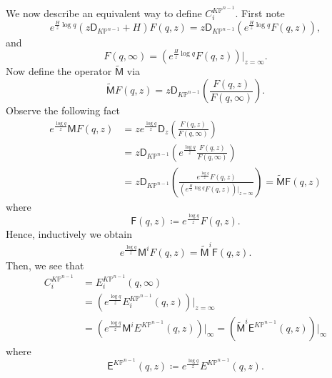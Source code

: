 \documentclass[12pt]{amsart}
\numberwithin{equation}{section}
\newcommand{\KP}{K\mathbb{P}}
\begin{document}
We now describe an equivalent way to define $C^{\KP^{n-1}}_i$. First note  
\begin{equation}\label{eqn:commutation_of_D_q_and_elogq}
e^{\frac{H}{z}\log q}\left(z\mathsf{D}_{K\mathbb{P}^{n-1}}+H\right)F(q,z)=z\mathsf{D}_{K\mathbb{P}^{n-1}}\left(e^{\frac{H}{z}\log q}F(q,z)\right),    
\end{equation}
and
\begin{equation*}
F(q,\infty)=\left(e^{\frac{H}{z}\log q}F(q,z)\right)\big\vert_{z=\infty}.
\end{equation*}
Now define the operator $\widetilde{\mathsf{M}}$ via
\begin{equation}\label{eqn:defntM}
\widetilde{\mathsf{M}}F(q,z)=z\mathsf{D}_{K\mathbb{P}^{n-1}}\left(\frac{F(q,z)}{F(q,\infty)}\right).
\end{equation}
Observe the following fact
\begin{equation*}
\begin{aligned}
e^{\frac{\log q}{z}}\mathsf{M}F(q,z)
&=ze^{\frac{\log q}{z}}\mathsf{D}_z\left(\frac{F(q,z)}{F(q,\infty)}\right)\\
&=z\mathsf{D}_{K\mathbb{P}^{n-1}}\left(e^{\frac{\log q}{z}}\frac{F(q,z)}{F(q,\infty)}\right)\\
&=z\mathsf{D}_{K\mathbb{P}^{n-1}}\left(\frac{e^{\frac{\log q}{z}}F(q,z)}{\left(e^{\frac{H}{z}\log q}F(q,z)\right)\big\vert_{z=\infty}}\right)=\widetilde{\mathsf{M}}\mathsf{F}(q,z)
\end{aligned}
\end{equation*}
where
\begin{equation*}
\mathsf{F}(q,z)\coloneqq{e^{\frac{\log q}{z}}F(q,z)}.
\end{equation*}
Hence, inductively we obtain 
\begin{equation*}
e^{\frac{\log q}{z}}\mathsf{M}^iF(q,z)=\widetilde{\mathsf{M}}^i\mathsf{F}(q,z).
\end{equation*}
Then, we see that
\begin{equation}\label{eqn:Ci_defined_by_Ei}
\begin{aligned}
C_i^{\KP^{n-1}}
&=E_i^{\KP^{n-1}}(q,\infty)\\
&=\left(e^{\frac{\log q}{z}}E_i^{\KP^{n-1}}(q,z)\right)\big\vert_{z=\infty}\\
&=\left(e^{\frac{\log q}{z}}\mathsf{M}^iE^{\KP^{n-1}}(q,z)\right)\big\vert_{\infty}=\left(\widetilde{\mathsf{M}}^i\mathsf{E}^{\KP^{n-1}}(q,z)\right)\big\vert_{\infty}
\end{aligned}
\end{equation}
where
\begin{equation*}
\mathsf{E}^{\KP^{n-1}}(q,z)\coloneqq e^{\frac{\log q}{z}}E^{\KP^{n-1}}(q,z).
\end{equation*}
\end{document}
